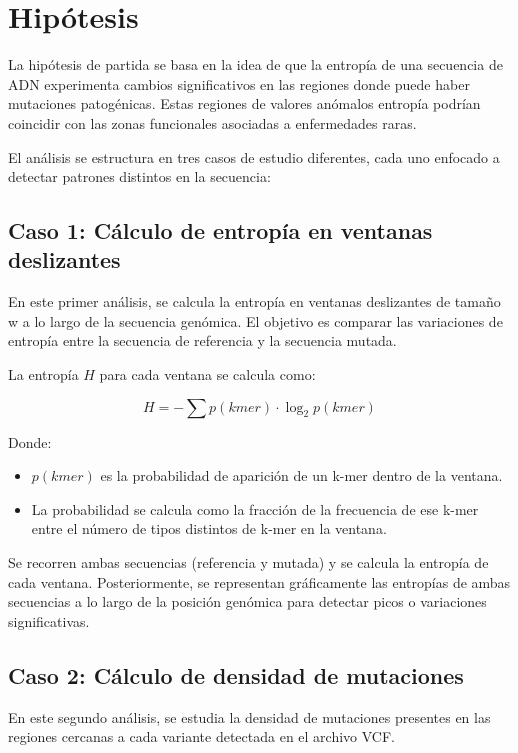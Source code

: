 \documentclass[11pt,spanish,listoffigures,listoftables]{tfgetsinf}
\begin{document}
\section{Hipótesis}

La hipótesis de partida se basa en la idea de que la entropía de una secuencia de ADN experimenta cambios significativos en las regiones donde puede haber mutaciones patogénicas. Estas regiones de valores anómalos entropía podrían coincidir con las zonas funcionales asociadas a enfermedades raras. 

El análisis se estructura en tres casos de estudio diferentes, cada uno enfocado a detectar patrones distintos en la secuencia:

\subsection{Caso 1: Cálculo de entropía en ventanas deslizantes}

En este primer análisis, se calcula la entropía en ventanas deslizantes de tamaño w a lo largo de la secuencia genómica. El objetivo es comparar las variaciones de entropía entre la secuencia de referencia y la secuencia mutada.

La entropía $H$ para cada ventana se calcula como:

\[
H = - \sum p(kmer) \cdot \log_2 p(kmer)
\]

Donde:

\begin{itemize}
   \item $p(kmer)$ es la probabilidad de aparición de un k-mer dentro de la ventana.
   \item La probabilidad se calcula como la fracción de la frecuencia de ese k-mer entre el número de tipos distintos de k-mer en la ventana.
\end{itemize}

Se recorren ambas secuencias (referencia y mutada) y se calcula la entropía de cada ventana. Posteriormente, se representan gráficamente las entropías de ambas secuencias a lo largo de la posición genómica para detectar picos o variaciones significativas.


\subsection{Caso 2: Cálculo de densidad de mutaciones}

En este segundo análisis, se estudia la densidad de mutaciones presentes en las regiones cercanas a cada variante detectada en el archivo VCF.
\end{document}
